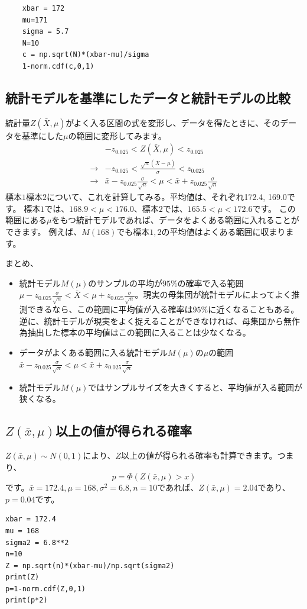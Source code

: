 \begin{lstlisting}
    xbar = 172
    mu=171
    sigma = 5.7
    N=10
    c = np.sqrt(N)*(xbar-mu)/sigma
    1-norm.cdf(c,0,1)
\end{lstlisting}
    


\subsection{統計モデルを基準にしたデータと統計モデルの比較}
統計量$Z(\bar{X},\mu)$がよく入る区間の式を変形し、データを得たときに、そのデータを基準にした$\mu$の範囲に変形してみます。
\begin{eqnarray*}
 & -z_{0.025} < Z(\bar{X},\mu)<z_{0.025} \\
\rightarrow & -z_{0.025} < \frac{\sqrt{n}(\bar{X}-\mu)}{\sigma}  <z_{0.025} \\
\rightarrow & \bar{x}- z_{0.025}\frac{\sigma}{\sqrt{n}} < \mu < \bar{x} + z_{0.025}\frac{\sigma}{\sqrt{n}}
\end{eqnarray*}
標本$1$標本$2$について、これを計算してみる。平均値は、それぞれ172.4, 169.0です。
標本$1$では、$168.9 < \mu < 176.0$、標本$2$では、$165.5 < \mu <172.6$です。
この範囲にある$\mu$をもつ統計モデルであれば、データをよくある範囲に入れることができます。
例えば、$M(168)$でも標本$1,2$の平均値はよくある範囲に収まります。

まとめ、
\begin{framed}
    \begin{itemize}
        \item 統計モデル$M(\mu)$のサンプルの平均が$95\%$の確率で入る範囲$\mu - z_{0.025} \frac{\sigma}{\sqrt{n}} < \bar{X} < \mu + z_{0.025} \frac{\sigma}{\sqrt{n}}$。現実の母集団が統計モデルによってよく推測できるなら、この範囲に平均値が入る確率は$95\%$に近くなることもある。逆に、統計モデルが現実をよく捉えることができなければ、母集団から無作為抽出した標本の平均値はこの範囲に入ることは少なくなる。
        \item データがよくある範囲に入る統計モデル$M(\mu)$の$\mu$の範囲$\bar{x}- z_{0.025}\frac{\sigma}{\sqrt{n}} < \mu < \bar{x} + z_{0.025}\frac{\sigma}{\sqrt{n}}$
        \item  統計モデル$M(\mu)$ではサンプルサイズを大きくすると、平均値が入る範囲が狭くなる。
    \end{itemize}
\end{framed}

\subsection{$Z(\bar{x},\mu)$以上の値が得られる確率}
$Z(\bar{x},\mu)\sim N(0,1)$により、$Z$以上の値が得られる確率も計算できます。つまり、
\begin{equation*}
    p = \varPhi(Z(\bar{x},\mu)>x)
\end{equation*}
です。$\bar{x}=172.4,\mu=168,\sigma^2=6.8,n=10$であれば、$Z(\bar{x},\mu)=2.04$であり、
$p=0.04$です。

\begin{lstlisting}
xbar = 172.4
mu = 168
sigma2 = 6.8**2
n=10
Z = np.sqrt(n)*(xbar-mu)/np.sqrt(sigma2)
print(Z)
p=1-norm.cdf(Z,0,1)
print(p*2)
\end{lstlisting}
